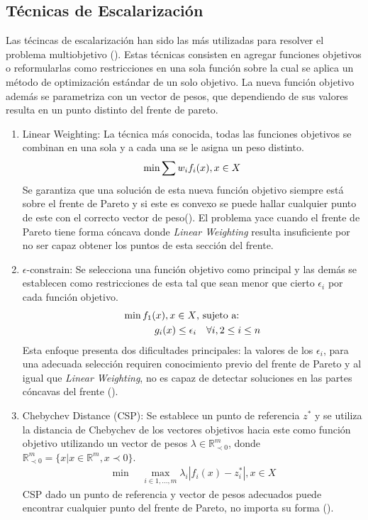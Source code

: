 \subsection{T\'ecnicas de Escalarizaci\'on }

Las t\'ecincas de escalarizaci\'on han sido las m\'as utilizadas para resolver el problema multiobjetivo (\cite{miettinen2012nonlinear}). Estas t\'ecnicas consisten en agregar funciones objetivos o  reformularlas como restricciones en una sola funci\'on sobre la cual se aplica un m\'etodo de optimizaci\'on est\'andar de un solo objetivo. La nueva funci\'on objetivo adem\'as se parametriza con un vector de pesos, que dependiendo de sus valores resulta en un punto distinto del frente de pareto.
\begin{enumerate}
    \item Linear Weighting: La t\'ecnica m\'as conocida, todas las funciones objetivos se combinan en una sola y a cada una se le asigna un peso distinto.
    \begin{equation*}
        \min \sum w_i f_i(x), \space x \in X
    \end{equation*}
    Se garantiza que una soluci\'on de esta nueva funci\'on objetivo siempre est\'a sobre el frente de Pareto  y si este es convexo se puede hallar cualquier punto de este con el correcto vector de peso(\cite{emmerich2018tutorial}). El problema yace cuando el frente de Pareto tiene forma c\'oncava donde \textit{Linear Weighting} resulta insuficiente por no ser capaz obtener los puntos de esta secci\'on del frente.

    \item $\epsilon$-constrain: Se selecciona una funci\'on objetivo como principal y las dem\'as se establecen como restricciones de esta tal que sean menor que cierto $\epsilon_i$  por cada funci\'on objetivo.
    \begin{align*}
            \min  f_1(x), \space x \in X  & \text{, sujeto a:}   \\
            g_i(x) \leq \epsilon_i & \quad  \forall i, 2 \leq i \leq n
    \end{align*}
    Esta enfoque presenta dos dificultades principales: la valores de los $\epsilon_i$, para una adecuada selecci\'on requiren conocimiento previo del frente de Pareto y al igual que \textit{Linear Weighting}, no es capaz de detectar soluciones en las partes c\'oncavas del frente (\cite{emmerich2018tutorial}).

\item Chebychev Distance (CSP): Se establece un punto de referencia $z^*$ y se utiliza la distancia de Chebychev de los vectores objetivos hacia este como funci\'on objetivo utilizando un vector de pesos $\lambda \in \mathbb{R}^m_{\prec 0}$, donde $\mathbb{R}^m_{\prec 0} = \{x | x \in \mathbb{R}^m, x \prec 0 \}$. 
    \begin{align*}
        \min \quad \max_{i \in {1,...,m}} \lambda_i |f_i(x) - z^*_i|, x \in X 
    \end{align*}
    CSP dado un punto de referencia y vector de pesos adecuados puede encontrar cualquier punto del frente de Pareto, no importa su forma (\cite{emmerich2018tutorial}).
\end{enumerate}

